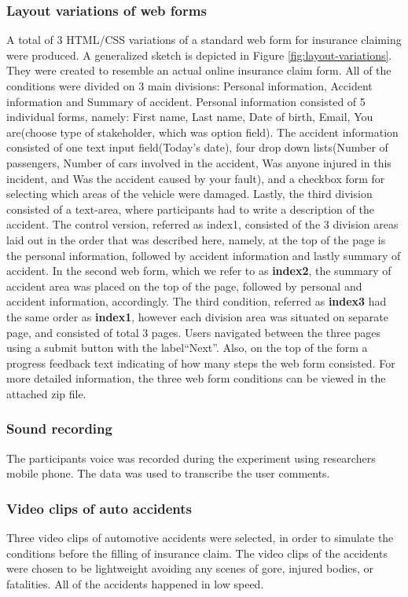 \documentclass[../main/Feedback.tex]{subfiles}
\begin{document}
\subsubsection{Layout variations of web forms}
A total of 3 HTML/CSS variations of a standard web form for insurance claiming were produced. A generalized sketch is depicted in Figure \ref{fig:layout-variations}. They were created to resemble an actual online insurance claim form. All of the conditions were divided on 3 main divisions: Personal information, Accident information and Summary of accident. Personal information consisted of 5 individual forms, namely: First name, Last name, Date of birth, Email, You are(choose type of stakeholder, which was option field). The accident information consisted of one text input field(Today's date), four drop down lists(Number of passengers, Number of cars involved in the accident, Was anyone injured in this incident, and Was the accident caused by your fault), and a checkbox form for selecting which areas of the vehicle were damaged. Lastly, the third division consisted of a text-area, where participants had to write a description of the accident. The control version, referred as index1, consisted of the 3 division areas laid out in the order that was described here, namely, at the top of the page is the personal information, followed by accident information and lastly summary of accident. In the second web form, which we refer to as \textbf{index2}, the summary of accident area was placed on the top of the page, followed by personal and accident information, accordingly. The third condition, referred as \textbf{index3} had the same order as \textbf{index1}, however each division area was situated on separate page, and consisted of total 3 pages. Users navigated between the three pages using a submit button with the label``Next''. Also, on the top of the form a progress feedback text indicating of how many steps the web form consisted. For more detailed information, the three web form conditions can be viewed in the attached zip file.
\subsubsection{Sound recording}
The participants voice was recorded during the experiment using researchers mobile phone. The data was used to transcribe the user comments.
\subsubsection{Video clips of auto accidents}
Three video clips of automotive accidents were selected, in order to simulate the conditions before the filling of insurance claim. The video clips of the accidents were chosen to be lightweight avoiding any scenes of gore, injured bodies, or fatalities. All of the accidents happened in low speed. 
\end{document}
